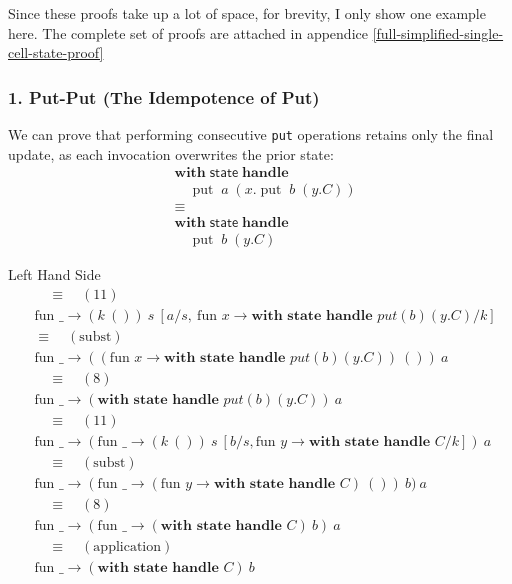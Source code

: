 \documentclass[logo,bsc,singlespacing,parskip]{infthesis}
\begin{document}
Since these proofs take up a lot of space, for brevity, I only show one example here. The complete set of proofs are attached in appendice \ref{full-simplified-single-cell-state-proof} 

\subsubsection*{1. Put-Put (The Idempotence of Put)}
We can prove that performing consecutive \lstinline{put} operations retains only the final update, as each invocation overwrites the prior state:
\[
\begin{aligned}
    &\mathsf{\textbf{with}} \; \mathsf{state} \; \mathsf{\textbf{handle}} \\
    &\quad \operatorname{put} \; a \; (x. \operatorname{put} \; b \; (y. C)) \\
    &\equiv \\
    &\mathsf{\textbf{with}} \; \mathsf{state} \; \mathsf{\textbf{handle}} \\
    &\quad \operatorname{put} \; b \; (y. C)
\end{aligned}
\]

{Left Hand Side}
\vspace{-0.5em}
\begin{align*}
&\quad\equiv\quad (11) \\
&\text{fun } \_ \rightarrow (k\ ())\ s\ [a/s,\ \text{fun } x \rightarrow \textbf{with state handle } put(b)(y.C)/k] \\
&\equiv\quad (\text{subst}) \\
&\text{fun } \_ \rightarrow ((\text{fun } x \rightarrow \textbf{with state handle } put(b)(y.C))\ ())\ a \\
&\quad\equiv\quad (8) \\
&\text{fun } \_ \rightarrow (\textbf{with state handle } put(b)(y.C))\ a \\
&\quad\equiv\quad (11) \\
&\text{fun } \_ \rightarrow (\text{fun } \_ \rightarrow (k\ ())\ s\ [b/s, \text{fun } y \rightarrow \textbf{with state handle } C/k])\ a \\
&\quad\equiv\quad (\text{subst}) \\
&\text{fun } \_ \rightarrow (\text{fun } \_ \rightarrow (\text{fun } y \rightarrow \textbf{with state handle } C)\ ())\ b)\ a \\
&\quad\equiv\quad (8) \\
&\text{fun } \_ \rightarrow (\text{fun } \_ \rightarrow (\textbf{with state handle } C)\ b)\ a \\
&\quad\equiv\quad (\text{application}) \\
&\text{fun } \_ \rightarrow (\textbf{with state handle } C)\ b
\end{align*}
\end{document}

